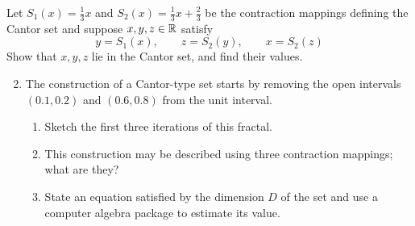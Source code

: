 \begin{exercises}
\exstart Let $S_1(x)=\frac 13 x$ and $S_2(x)=\frac 13x+\frac 23$ be the contraction mappings defining the Cantor set and suppose $x,y,z\in\mathbb{R}$ satisfy
  \[y=S_1(x),\qquad z=S_2(y),\qquad x=S_2(z)\]
  Show that $x,y,z$ lie in the Cantor set, and find their values.

  
\begin{enumerate}\setcounter{enumi}{1}
  \item The construction of a Cantor-type set starts by removing the open intervals $(0.1,0.2)$ and $(0.6,0.8)$ from the unit interval.
  \begin{enumerate}
    \item Sketch the first three iterations of this fractal.
    \item This construction may be described using three contraction mappings; what are they?
    \item State an equation satisfied by the dimension $D$ of the set and use a computer algebra package to estimate its value.
  \end{enumerate}
  

\end{enumerate}
\end{exercises}
